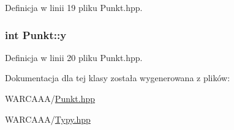 Definicja w linii 19 pliku Punkt.\-hpp.

\hypertarget{class_punkt_a68c1591209ee35bec2189fb87cbe57bb}{
\subsubsection[{y}]{\setlength{\rightskip}{0pt plus 5cm}int Punkt\-::y}}\label{class_punkt_a68c1591209ee35bec2189fb87cbe57bb}


Definicja w linii 20 pliku Punkt.\-hpp.



Dokumentacja dla tej klasy została wygenerowana z plików\-:\begin{DoxyCompactItemize}
\item 
W\-A\-R\-C\-A\-A\-A/\hyperlink{_punkt_8hpp}{Punkt.\-hpp}\item 
W\-A\-R\-C\-A\-A\-A/\hyperlink{_typy_8hpp}{Typy.\-hpp}\end{DoxyCompactItemize}
